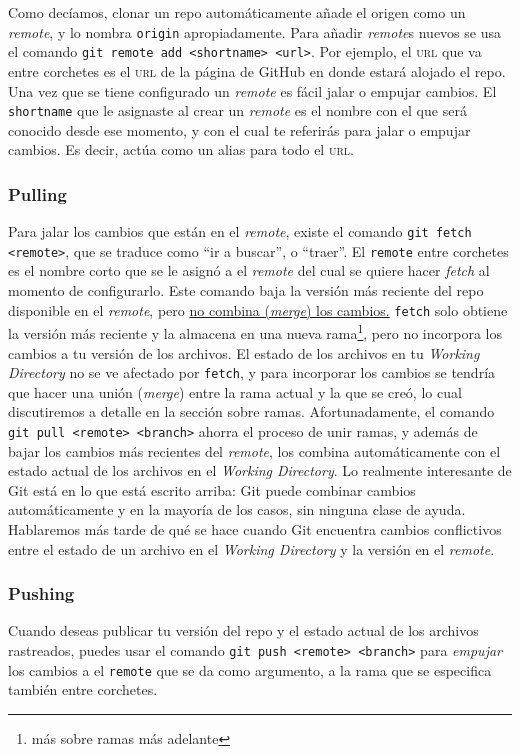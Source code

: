 \documentclass[spanish, 12pt, a4paper]{article}
\begin{document}
Como decíamos, clonar un repo automáticamente añade el origen como un
\textit{remote}, y lo nombra \texttt{origin} apropiadamente.
Para añadir \textit{remote}s nuevos se usa el comando \texttt{git remote add
<shortname> <url>}.
Por ejemplo, el \textsc{url} que va entre corchetes es el \textsc{url} de la
página de GitHub en donde estará alojado el repo.
Una vez que se tiene configurado un \textit{remote} es fácil jalar o empujar
cambios.
El \texttt{shortname} que le asignaste al crear un \textit{remote} es el nombre
con el que será conocido desde ese momento, y con el cual te referirás para
jalar o empujar cambios.
Es decir, actúa como un alias para todo el \textsc{url}.

\subsubsection{Pulling}
Para jalar los cambios que están en el \textit{remote}, existe el comando
\texttt{git fetch <remote>}, que se traduce como ``ir a buscar'', o ``traer''.
El \texttt{remote} entre corchetes es el nombre corto que se le asignó a el
\textit{remote} del cual se quiere hacer \textit{fetch} al momento de
configurarlo.
Este comando baja la versión más reciente del repo disponible en el
\textit{remote}, pero \underline{no combina (\textit{merge}) los cambios.}
\texttt{fetch} solo obtiene la versión más reciente y la almacena en una nueva
rama\footnote{más sobre ramas más adelante}, pero no incorpora los cambios a tu
versión de los archivos.
El estado de los archivos en tu \textit{Working Directory} no se ve afectado por
\texttt{fetch}, y para incorporar los cambios se tendría que hacer una unión
(\textit{merge}) entre la rama actual y la que se creó, lo cual discutiremos a
detalle en la sección sobre ramas.
Afortunadamente, el comando \texttt{git pull <remote> <branch>} ahorra el
proceso de unir ramas, y además de bajar los cambios más recientes del
\textit{remote}, los combina automáticamente con el estado actual de los
archivos en el \textit{Working Directory}.
Lo realmente interesante de Git está en lo que está escrito arriba: Git puede
combinar cambios automáticamente y en la mayoría de los casos, sin ninguna clase
de ayuda.
Hablaremos más tarde de qué se hace cuando Git encuentra cambios conflictivos
entre el estado de un archivo en el \textit{Working Directory} y la versión en
el \textit{remote}.

\subsubsection{Pushing}
Cuando deseas publicar tu versión del repo y el estado actual de los archivos
rastreados, puedes usar el comando \texttt{git push <remote> <branch>} para
\textit{empujar} los cambios a el \texttt{remote} que se da como argumento, a la
rama que se especifica también entre corchetes.
\end{document}
